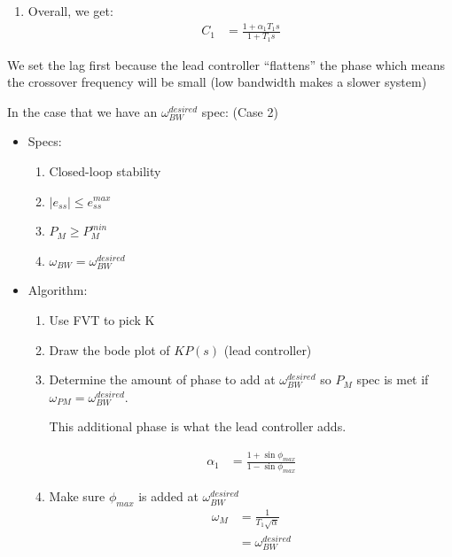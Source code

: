 \begin{enumerate}
\begin{enumerate}
\begin{itemize}
\begin{enumerate}
\begin{enumerate}
                                    \item Overall, we get:
                                        \begin{align*}
                                            C_1 &= \frac{1 + \alpha_1 T_1 s}{1 + T_1 s}
                                        \end{align*}
                                \end{enumerate}
                        \end{enumerate}
                \end{itemize}
                We set the lag first because the lead controller ``flattens'' the phase which means the crossover frequency will be small (low bandwidth makes a slower system)

                In the case that we have an $\omega_{BW}^{desired}$ spec: (Case 2)
                \begin{itemize}
                    \item Specs:
                        \begin{enumerate}
                            \item Closed-loop stability
                            \item $|e_{ss}| \le e_{ss}^{max}$
                            \item $P_M \ge P_M^{min}$
                            \item $\omega_{BW} = \omega_{BW}^{desired}$
                        \end{enumerate}

                    \item Algorithm:
                        \begin{enumerate}
                            \item Use FVT to pick K
                            \item Draw the bode plot of $KP(s)$ (lead controller)
                            \item Determine the amount of phase to add at $\omega_{BW}^{desired}$ so $P_M$ spec is met if $\omega_{PM} = \omega_{BW}^{desired}$.

                                This additional phase is what the lead controller adds.

                                \begin{align*}
                                    \alpha_1 &= \frac{1 + \sin \phi_{max}}{1 - \sin \phi_{max}}
                                \end{align*}
                            \item Make sure $\phi_{max}$ is added at $\omega_{BW}^{desired}$
                                \begin{align*}
                                    \omega_{M} &= \frac{1}{T_1 \sqrt{\alpha}} \\
                                    &= \omega_{BW}^{desired}
                                \end{align*}


\end{enumerate}
\end{itemize}
\end{enumerate}
\end{enumerate}
